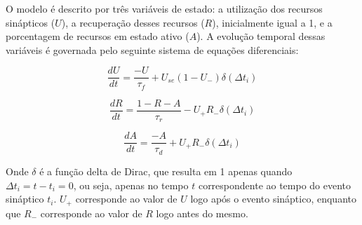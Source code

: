O modelo é descrito por três variáveis de estado: a utilização dos recursos sinápticos ($U$), a recuperação desses recursos ($R$),
inicialmente igual a 1, e a porcentagem de recursos em estado ativo ($A$). A evolução temporal dessas
variáveis é governada pelo seguinte sistema de equações diferenciais:

\begin{equation}
    \label{eq_tsodyks_dU}
    \frac{dU}{dt} = \frac{-U}{\tau_f} + U_{se}(1-U_{-}) \delta(\Delta t_i)
\end{equation}

\begin{equation}
    \label{eq_tsodyks_dR}
    \frac{dR}{dt} = \frac{1-R-A}{\tau_r} - U_{+} R_{-} \delta(\Delta t_i)
\end{equation}

\begin{equation}
    \label{eq_tsodyks_dA}
    \frac{dA}{dt} = \frac{-A}{\tau_d} + U_{+} R_{-} \delta(\Delta t_i)
\end{equation}

Onde $\delta$ é a função delta de Dirac, que resulta em 1 apenas quando $\Delta t_i = t - t_i = 0$, ou seja, apenas no tempo $t$
correspondente ao tempo do evento sináptico $t_i$. $U_{+}$ corresponde ao valor de $U$ logo após o evento sináptico, enquanto que
$R_{-}$ corresponde ao valor de $R$ logo antes do mesmo.






